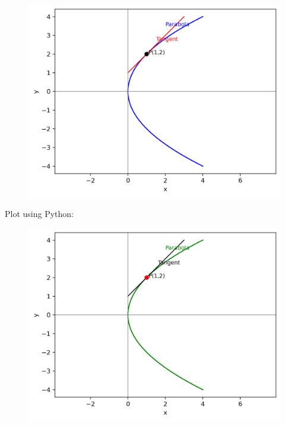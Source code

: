 \documentclass[journal,12pt,onecolumn]{IEEEtran}
\begin{document}
\begin{figure}[H]
	\centering
	\includegraphics[scale=0.5]{img1}
	\caption*{}
	\label{img1}
\end{figure}
Plot using Python:
\begin{figure}[H]
	\centering
	\includegraphics[scale=0.5]{img2}
	\caption*{}
	\label{img2}
\end{figure}
\end{document}
